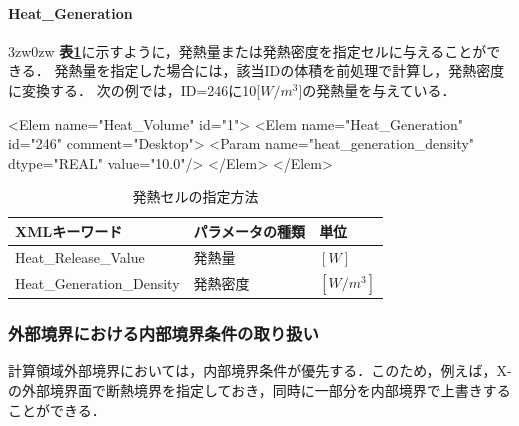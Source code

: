 \paragraph{Heat\_Generation}
\begin{indentation}{3zw}{0zw}
\textbf{表\ref{tbl:heat_generation}}に示すように，発熱量または発熱密度を指定セルに与えることができる．
発熱量を指定した場合には，該当IDの体積を前処理で計算し，発熱密度に変換する．
次の例では，ID=246に10[$W/m^3$]の発熱量を与えている．

{ \small
\begin{program}
<Elem name="Heat_Volume" id="1">
  <Elem name="Heat_Generation" id="246" comment="Desktop">
    <Param name="heat_generation_density" dtype="REAL" value="10.0"/>
  </Elem>
</Elem>
\end{program}
}

\begin{table}[htdp]
\small
\caption{発熱セルの指定方法}
\begin{center}
\begin{tabular}{lll} \toprule
XMLキーワード & パラメータの種類 & 単位\\ \midrule
Heat\_Release\_Value & 発熱量 & $[W]$\\
Heat\_Generation\_Density & 発熱密度 & $[W/m^3]$\\ \bottomrule
\end{tabular}
\end{center}
\label{tbl:heat_generation}
\end{table}

\end{indentation}


%


%
\subsubsection{外部境界における内部境界条件の取り扱い}
\label{sec:heat_mix_bc}

計算領域外部境界においては，内部境界条件が優先する．このため，例えば，X-の外部境界面で断熱境界を指定しておき，同時に一部分を内部境界で上書きすることができる．








